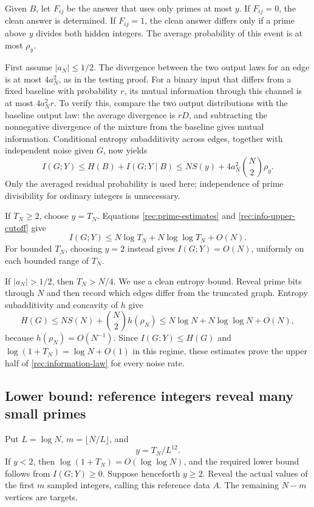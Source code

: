 Given $B$, let $F_{ij}$ be the answer that uses only primes at most
$y$. If $F_{ij}=0$, the clean answer is determined. If $F_{ij}=1$,
the clean answer differs only if a prime above $y$ divides both hidden
integers. The average probability of this event is at most $\rho_y$.

First assume $|a_N|\le1/2$. The divergence between the two output laws
for an edge is at most $4a_N^2$, as in the testing proof. For a binary
input that differs from a fixed baseline with probability $r$, its
mutual information through this channel is at most $4a_N^2r$.
To verify this, compare the two output distributions with the baseline
output law: the average divergence is $rD$, and subtracting the
nonnegative divergence of the mixture from the baseline gives mutual
information. Conditional entropy subadditivity across edges, together
with independent noise given $G$, now yields
\begin{equation}\label{rec:info-upper-cutoff}
 I(G;Y)\le H(B)+I(G;Y\mid B)
 \le NS(y)+4a_N^2\binom N2\rho_y.
\end{equation}
Only the averaged residual probability is used here; independence of
prime divisibility for ordinary integers is unnecessary.

If $T_N\ge2$, choose $y=T_N$. Equations
\eqref{rec:prime-estimates} and \eqref{rec:info-upper-cutoff} give
\[
 I(G;Y)\le N\log T_N+N\log\log T_N+O(N).
\]
For bounded $T_N$, choosing $y=2$ instead gives $I(G;Y)=O(N)$,
uniformly on each bounded range of $T_N$.

If $|a_N|>1/2$, then $T_N>N/4$. We use a clean entropy bound. Reveal
prime bits through $N$ and then record which edges differ from the
truncated graph. Entropy subadditivity and concavity of $h$ give
\begin{equation}\label{rec:clean-upper}
 H(G)\le NS(N)+\binom N2h(\rho_N)
 \le N\log N+N\log\log N+O(N),
\end{equation}
because $h(\rho_N)=O(N^{-1})$. Since $I(G;Y)\le H(G)$ and
$\log(1+T_N)=\log N+O(1)$ in this regime, these estimates prove the
upper half of \eqref{rec:information-law} for every noise rate.

\subsection{Lower bound: reference integers reveal many small primes}

Put $L=\log N$, $m=\lfloor N/L\rfloor$, and
\begin{equation}\label{rec:reference-cutoff}
 y=T_N/L^{12}.
\end{equation}
If $y<2$, then $\log(1+T_N)=O(\log\log N)$, and the required lower
bound follows from $I(G;Y)\ge0$. Suppose henceforth $y\ge2$.
Reveal the actual values of the first $m$ sampled integers, calling
this reference data $A$. The remaining $N-m$ vertices are targets.


